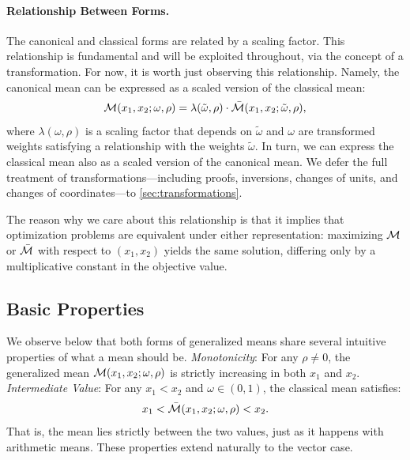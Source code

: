 \paragraph{Relationship Between Forms.}
\label{subsec:relationship-forms}

The canonical and classical forms are related by a scaling factor. This relationship is fundamental and will be exploited throughout, via the concept of a transformation. For now, it is worth just observing this relationship. Namely, the canonical mean can be expressed as a scaled version of the classical mean:
\begin{equation}
\mathcal{M}(x_1, x_2; \omega, \rho) = \lambda(\tilde{\omega}, \rho) \cdot \bar{\mathcal{M}}(x_1, x_2; \tilde{\omega}, \rho),
\end{equation}
where $\lambda(\omega, \rho)$ is a scaling factor that depends on $\tilde{\omega}$ and $\omega$ are transformed weights satisfying a relationship with the weights $\tilde{\omega}$. In turn, we can express the classical mean also as a scaled version of the canonical mean. We defer the full treatment of transformations---including proofs, inversions, changes of units, and changes of coordinates---to \cref{sec:transformations}.

\begin{remark}
The reason why we care about this relationship is that it implies that optimization problems are equivalent under either representation: maximizing $\mathcal{M}$ or $\bar{\mathcal{M}}$ with respect to $(x_1, x_2)$ yields the same solution, differing only by a multiplicative constant in the objective value.
\end{remark}



\subsection{Basic Properties}

We observe below that both forms of generalized means share several intuitive properties of what a mean should be. \textit{Monotonicity}:
For any $\rho \neq 0$, the generalized mean $\mathcal{M}(x_1, x_2; \omega, \rho)$ is strictly increasing in both $x_1$ and $x_2$. \textit{Intermediate Value}: For any $x_1 < x_2$ and $\omega \in (0,1)$, the classical mean satisfies:
\[
x_1 < \bar{\mathcal{M}}(x_1, x_2; \omega, \rho) < x_2.
\]
That is, the mean lies strictly between the two values, just as it happens with arithmetic means. These properties extend naturally to the vector case.

